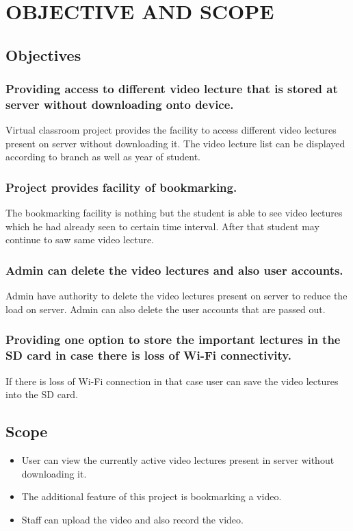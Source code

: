 \chapter{OBJECTIVE AND SCOPE}

\section{Objectives}

\subsection{Providing access to different video lecture that is stored at server without downloading onto device.}
Virtual classroom project provides the facility to access different video lectures present on server without downloading it. The video lecture list can be displayed according to branch as well as year of student.

\subsection{Project provides facility of bookmarking.}
The bookmarking facility is nothing but the student is able to see video lectures which he had already seen to certain time interval. After that student may continue to saw same video lecture.

\subsection{Admin can delete the video lectures and also user accounts.}
Admin have authority to delete the video lectures present on server to reduce the load on server. Admin can also delete the user accounts that are passed out. 

\subsection{Providing one option to store the important lectures in the SD card in case there is loss of Wi-Fi connectivity.}
               If there is loss of Wi-Fi connection in that case user can save the video lectures into the SD card.



\section{Scope}
\begin{itemize}
\item User can view the currently active video lectures present in server without downloading it. 
\item The additional feature of this project is bookmarking a video.       
\item Staff can upload the video and also record the video.
\end{itemize}

